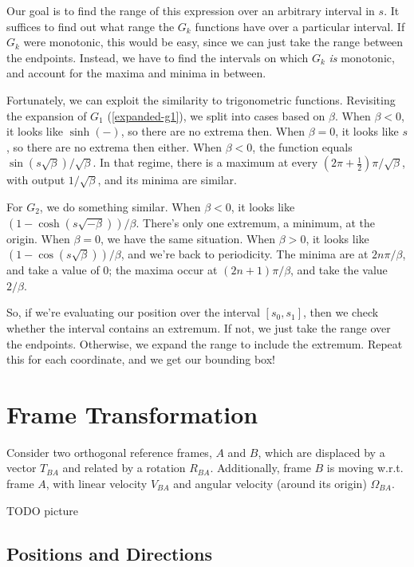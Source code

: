 \documentclass{article}
\numberwithin{equation}{subsection}
\begin{document}
Our goal is to find the range of this expression over an arbitrary interval in $s$. It suffices to find out what range the $G_k$ functions have over a particular interval. If $G_k$ were monotonic, this would be easy, since we can just take the range between the endpoints. Instead, we have to find the intervals on which $G_k$ \textit{is} monotonic, and account for the maxima and minima in between.

Fortunately, we can exploit the similarity to trigonometric functions. Revisiting the expansion of $G_1$ (\ref{expanded-g1}), we split into cases based on $\beta$. When $\beta < 0$, it looks like $\sinh(-)$, so there are no extrema then. When $\beta = 0$, it looks like $s$, so there are no extrema then either. When $\beta < 0$, the function equals $\sin(s \sqrt \beta) / \sqrt \beta$. In that regime, there is a maximum at every $\left( 2\pi + \frac{1}{2} \right) \pi / \sqrt \beta$, with output $1/\sqrt \beta$, and its minima are similar.

For $G_2$, we do something similar. When $\beta < 0$, it looks like $(1 - \cosh(s \sqrt{-\beta})) / \beta$. There's only one extremum, a minimum, at the origin. When $\beta = 0$, we have the same situation. When $\beta > 0$, it looks like $(1 - \cos(s \sqrt \beta)) / \beta$, and we're back to periodicity. The minima are at $2n\pi / \beta$, and take a value of $0$; the maxima occur at $(2n+1)\pi/\beta$, and take the value $2/\beta$.

So, if we're evaluating our position over the interval $[s_0, s_1]$, then we check whether the interval contains an extremum. If not, we just take the range over the endpoints. Otherwise, we expand the range to include the extremum. Repeat this for each coordinate, and we get our bounding box!


\section{Frame Transformation}
Consider two orthogonal reference frames, $A$ and $B$, which are displaced by a vector $T_{BA}$ and related by a rotation $R_{BA}$. Additionally, frame $B$ is moving w.r.t. frame $A$, with linear velocity $V_{BA}$ and angular velocity (around its origin) $\Omega_{BA}$.

TODO picture

\subsection{Positions and Directions}
\end{document}
